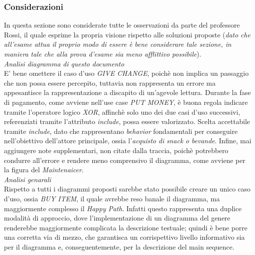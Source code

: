 \documentclass{article}
\begin{document}
\subsubsection*{Considerazioni}
In questa sezione sono considerate tutte le osservazioni da parte del professore Rossi, il quale esprime la propria visione rispetto
alle soluzioni proposte (\textit{dato che all'esame attua il proprio modo di essere è bene considerare tale sezione, in maniera tale che alla prova d'esame sia meno afflittivo possibile}).\vspace{14pt}\\
\textit{Analisi diagramma di questo documento}\\
E' bene omettere il caso d'uso \textit{GIVE CHANGE}, poichè non implica un passaggio che non possa essere percepito, tuttavia non rappresenta un errore ma appesantisce la rappresentazione a discapito di un'agevole lettura.
Durante la fase di pagamento, come avviene nell'use case \textit{PUT MONEY}, è buona regola indicare tramite l'operatore logico \textit{XOR}, affinchè solo uno dei due casi d'uso successivi, referenziati tramite l'attributo \textit{include}, possa essere valorizzato.
Scelta accettabile tramite \textit{include}, dato che rappresentano \textit{behavior} fondamentali per conseguire nell'obiettivo dell'attore principale, ossia l'\textit{acquisto di snack o bevande}. Infine, mai aggiungere note supplementari, non citate dalla traccia, poichè potrebbero condurre all'errore e rendere meno comprensivo il diagramma, come avviene per la figura del \textit{Maintenaicer}.\vspace{14pt}\\
\textit{Analisi genarali}\\
Rispetto a tutti i diagrammi proposti sarebbe stato possibile creare un unico caso d'uso, ossia \textit{BUY ITEM}, il quale avrebbe reso banale il diagramma, ma maggiormente complesso il \textit{Happy Path}. Infatti questo rappresenta una duplice modalità di approccio, dove l'implementazione di un diagramma del genere renderebbe maggiormente complicata la descrizione testuale; quindi è bene porre una corretta via di mezzo, che garantisca un corrispettivo livello informativo sia per il diagramma e, conseguentemente, per la descrizione del main sequence.
\end{document}
